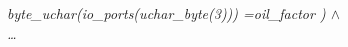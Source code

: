 {\begin{sloppypar}
\hspace*{1.10in}\it byte\_uchar\rm (\it io\_ports\rm (\it uchar\_byte\rm (\rm 3\rm )\rm )\rm ) \rm
=\hspace*{0.10in}\it oil\_factor \rm ) $\land$\\
\hspace*{1.10in}\ldots\\ 

\end{sloppypar}}
